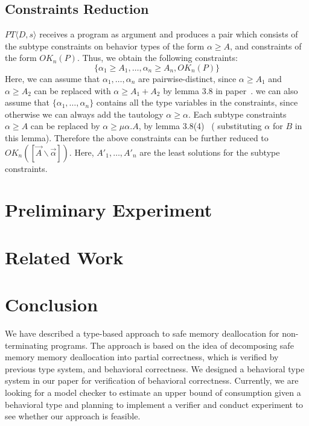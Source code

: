 \documentclass[english]{jssst_ppl} %
\theoremstyle{definition}
\begin{document}
\subsection{Constraints Reduction}
$PT\langle D, s \rangle$ receives a program as argument and produces a pair which consists of the subtype constraints on behavior types of the form $\alpha \ge A$, and constraints of the form $OK_{n}(P)$. Thus, we obtain the following constraints:\\
$$
\{ \alpha_{1} \ge A_{1}, \dots, \alpha_{n} \ge  A_{n}, OK_{n}(P)\}
$$
Here, we can assume that $\alpha_{1}, \dots, \alpha_{n}$ are pairwise-distinct, since $\alpha \ge A_{1}$ and $\alpha \ge A_{2}$ can be replaced with $\alpha \ge A_{1}+A_{2}$ by lemma 3.8 in paper~\cite{DBLP:journals/lmcs/KobayashiSW06}. we can also assume that $\{ \alpha_{1}, \dots, \alpha_{n} \}$ contains all the type variables in the constraints, since otherwise we can always add the tautology $\alpha \ge \alpha$. Each subtype constraints $\alpha \ge A$ can be replaced by $\alpha \ge \mu \alpha. A$, by lemma 3.8(4)~\cite{DBLP:journals/lmcs/KobayashiSW06} ( substituting $\alpha$ for $B$ in this lemma). Therefore the above constraints can be further reduced to $OK_{n}([\vec{A} \backslash \vec{\alpha}])$. Here, $A'_{1}, \dots, A'_{n}$ are the least solutions for the subtype constraints.

\section{Preliminary Experiment}

\section{Related Work}

\section{Conclusion}
We have described a type-based approach to safe memory deallocation for non-terminating programs. The approach is based on the idea of decomposing safe memory memory deallocation into partial correctness, which is verified by previous type system, and behavioral correctness. We designed a behavioral type system in our paper for verification of behavioral correctness. Currently, we are looking for a model checker to estimate an upper bound of consumption given a behavioral type and planning to implement a verifier and conduct experiment to see whether our approach is feasible.
\end{document}
